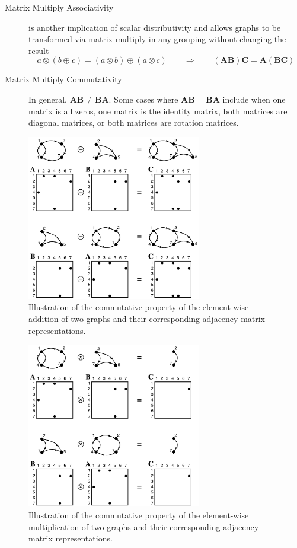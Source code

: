 \begin{description}
\item[Matrix Multiply Associativity] is another implication of scalar distributivity and allows graphs to be transformed via matrix multiply in any grouping without changing the result
  $$
      a \otimes (b \oplus c) = (a \otimes b) \oplus (a \otimes c)   ~~~~~~~~~ \Rightarrow ~~~~~~~~~
      (\mathbf{A} \mathbf{B}) \mathbf{C} = \mathbf{A} (\mathbf{B} \mathbf{C})
  $$
\item[Matrix Multiply Commutativity] In general, $\mathbf{A} \mathbf{B} \neq \mathbf{B} \mathbf{A}$.  Some cases where $\mathbf{A} \mathbf{B} = \mathbf{B} \mathbf{A}$ include when one matrix is all zeros, one matrix is the identity matrix, both matrices are diagonal matrices, or both matrices are rotation matrices.
\end{description}

\begin{figure}[htb]
  \centering
    \includegraphics[width=3in]{figures/AdjacencyMatrixAdd.pdf}
      \caption{Illustration of the commutative property of the element-wise addition of two graphs and their corresponding adjacency matrix representations.}
      \label{fig:AdjacencyMatrixAdd}
\end{figure}
\begin{figure}[!htb]
  \centering
    \includegraphics[width=3in]{figures/AdjacencyMatrixMult.pdf}
      \caption{Illustration of the commutative property of the element-wise multiplication of two graphs and their corresponding adjacency matrix representations.}
      \label{fig:AdjacencyMatrixMult}
\end{figure}



